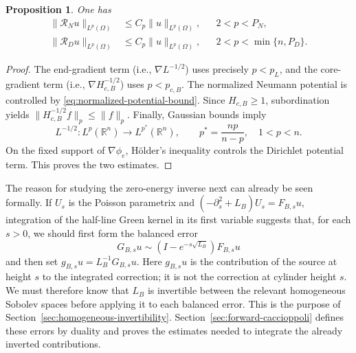 \documentclass[12pt]{amsart}
\newtheorem{proposition}[theorem]{Proposition}
\theoremstyle{remark}
\newtheorem{remark}[theorem]{Remark}
\begin{document}
\begin{proposition}\label{prop:explicit-parametrix}
One has
\begin{align*}
 \|\mathcal R_Nu\|_{L^p(\Omega)}
 &\le C_p\|u\|_{L^p(\Omega)},&&2<p<P_N,\\
 \|\mathcal R_Du\|_{L^p(\Omega)}
 &\le C_p\|u\|_{L^p(\Omega)},&&2<p<\min\{n,P_D\}.
\end{align*}
\end{proposition}

\begin{proof}
The end-gradient term (i.e., $\nabla L^{-1/2}$) uses precisely \(p<p_L\), and the core-gradient term (i.e., $\nabla H^{-1/2}_{c,B}$)
uses \(p<p_{c,B}\).  The normalized Neumann potential is controlled by
\eqref{eq:normalized-potential-bound}.  Since \(H_{c,B}\ge1\),
subordination yields
\(\|H_{c,B}^{-1/2}f\|_p\le\|f\|_p\).  Finally, Gaussian bounds imply
\[
 L^{-1/2}:L^p(\mathbb R^n)\longrightarrow L^{p^*}(\mathbb R^n),
 \qquad p^*=\frac{np}{n-p},\quad1<p<n.
\]
On the fixed support of \(\nabla\phi_e\), H\"older's inequality controls
the Dirichlet potential term.  This proves the two estimates.
\end{proof}


The reason for studying the zero-energy inverse next can already be seen
formally.  If \(U_s\) is the Poisson parametrix and
\((-\partial_s^2+L_B)U_s=F_{B,s}u\), integration of the half-line Green
kernel in its first variable suggests that, for each \(s>0\), we should
first form the balanced error
\[
 G_{B,s}u\sim(I-e^{-s\sqrt{L_B}})F_{B,s}u
\]
and then set \(g_{B,s}u=L_B^{-1}G_{B,s}u\).  Here \(g_{B,s}u\) is the
contribution of the source at height \(s\) to the integrated correction;
it is not the correction at cylinder height \(s\).  We must therefore
know that \(L_B\) is invertible between the relevant homogeneous Sobolev
spaces before applying it to each balanced error.  This is the purpose
of Section~\ref{sec:homogeneous-invertibility}.  Section~\ref{sec:forward-caccioppoli}
defines these errors by duality and proves the estimates needed to
integrate the already inverted contributions.
\end{document}

